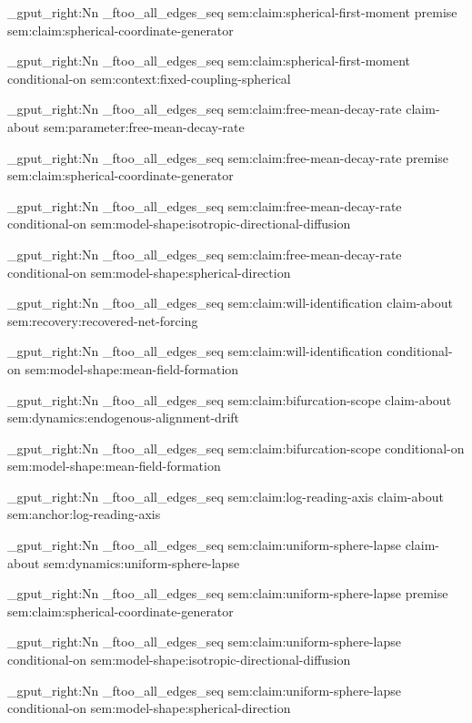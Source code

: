 \seq_gput_right:Nn \g_ftoo_all_edges_seq { { sem:claim:spherical-first-moment } { premise } { sem:claim:spherical-coordinate-generator } }

\seq_gput_right:Nn \g_ftoo_all_edges_seq { { sem:claim:spherical-first-moment } { conditional-on } { sem:context:fixed-coupling-spherical } }

\seq_gput_right:Nn \g_ftoo_all_edges_seq { { sem:claim:free-mean-decay-rate } { claim-about } { sem:parameter:free-mean-decay-rate } }

\seq_gput_right:Nn \g_ftoo_all_edges_seq { { sem:claim:free-mean-decay-rate } { premise } { sem:claim:spherical-coordinate-generator } }

\seq_gput_right:Nn \g_ftoo_all_edges_seq { { sem:claim:free-mean-decay-rate } { conditional-on } { sem:model-shape:isotropic-directional-diffusion } }

\seq_gput_right:Nn \g_ftoo_all_edges_seq { { sem:claim:free-mean-decay-rate } { conditional-on } { sem:model-shape:spherical-direction } }

\seq_gput_right:Nn \g_ftoo_all_edges_seq { { sem:claim:will-identification } { claim-about } { sem:recovery:recovered-net-forcing } }

\seq_gput_right:Nn \g_ftoo_all_edges_seq { { sem:claim:will-identification } { conditional-on } { sem:model-shape:mean-field-formation } }

\seq_gput_right:Nn \g_ftoo_all_edges_seq { { sem:claim:bifurcation-scope } { claim-about } { sem:dynamics:endogenous-alignment-drift } }

\seq_gput_right:Nn \g_ftoo_all_edges_seq { { sem:claim:bifurcation-scope } { conditional-on } { sem:model-shape:mean-field-formation } }

\seq_gput_right:Nn \g_ftoo_all_edges_seq { { sem:claim:log-reading-axis } { claim-about } { sem:anchor:log-reading-axis } }

\seq_gput_right:Nn \g_ftoo_all_edges_seq { { sem:claim:uniform-sphere-lapse } { claim-about } { sem:dynamics:uniform-sphere-lapse } }

\seq_gput_right:Nn \g_ftoo_all_edges_seq { { sem:claim:uniform-sphere-lapse } { premise } { sem:claim:spherical-coordinate-generator } }

\seq_gput_right:Nn \g_ftoo_all_edges_seq { { sem:claim:uniform-sphere-lapse } { conditional-on } { sem:model-shape:isotropic-directional-diffusion } }

\seq_gput_right:Nn \g_ftoo_all_edges_seq { { sem:claim:uniform-sphere-lapse } { conditional-on } { sem:model-shape:spherical-direction } }

